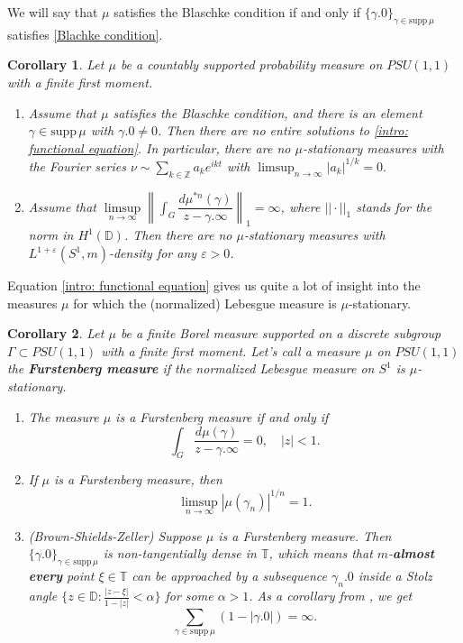 \documentclass[11pt]{article}
\newtheorem{corollary}{Corollary}[section]
\begin{document}
We will say that $\mu$ satisfies the Blaschke condition if and only if $\{ \gamma.0 \}_{\gamma \in \text{supp} \, \mu}$ satisfies \eqref{Blachke condition}.

\begin{corollary}
	\label{C:main corollary}
	Let $\mu$ be a countably supported probability measure on $PSU(1,1)$ with a finite first moment.
	\begin{enumerate}
		\item Assume that $\mu$ satisfies the Blaschke condition, and there is an element $\gamma \in \text{supp} \, \mu$ with $\gamma.0 \ne 0$. Then there are no entire solutions to \eqref{intro: functional equation}. In particular, there are no $\mu$-stationary measures with the Fourier series $\nu \sim \sum_{k \in \mathbb{Z}} a_k e^{i k t}$ with $\limsup_{n \rightarrow \infty} |a_k|^{1/k} = 0.$
		\item Assume that $\limsup\limits_{n \rightarrow \infty} \left\| \int_G \dfrac{d \mu^{*n}(\gamma)}{z - \gamma.\infty} \right\|_1 = \infty$, where $||\cdot||_1$ stands for the norm in $H^1(\mathbb{D})$. Then there are no $\mu$-stationary measures with $L^{1+\varepsilon}(S^1, m)$-density for any $\varepsilon > 0$.
	\end{enumerate}
\end{corollary}

Equation \eqref{intro: functional equation} gives us quite a lot of insight into the measures $\mu$ for which the (normalized) Lebesgue measure is $\mu$-stationary.

\begin{corollary}
	\label{intro: Lebesgue is stationary}
	Let $\mu$ be a finite Borel measure supported on a discrete subgroup $\Gamma \subset PSU(1,1)$ with a finite first moment. Let's call a measure $\mu$ on $PSU(1,1)$  the \textbf{Furstenberg measure} if the normalized Lebesgue measure on $S^1$ is $\mu$-stationary.
	\begin{enumerate}
		\item The measure $\mu$ is a Furstenberg measure if and only if
		\begin{equation}
			\int_G \frac{d \mu(\gamma)}{z - \gamma.\infty} = 0, \quad |z| < 1.
		\end{equation}
		\item If $\mu$ is a Furstenberg measure, then
		\[
		\limsup_{n \rightarrow \infty} |\mu(\gamma_n)|^{1/n} = 1.
		\]
		\item (Brown-Shields-Zeller) Suppose $\mu$ is a Furstenberg measure. Then $\{\gamma.0\}_{\gamma \in \text{supp} \, \mu}$ is non-tangentially dense in $\mathbb{T}$, which means that $m$-\textbf{almost every} point $\xi \in \mathbb{T}$ can be approached by a subsequence $\gamma_n.0$ inside a Stolz angle $\{ z \in \mathbb{D} : \frac{|z - \xi|}{1 - |z|} < \alpha \}$ for some $\alpha > 1$. As a corollary from \cite[Remark 2]{brownsums}, we get
		\[
		\sum_{\gamma \in \text{supp}\, \mu} (1 - |\gamma.0|) = \infty.
		\]
	\end{enumerate}
\end{corollary}
\end{document}
